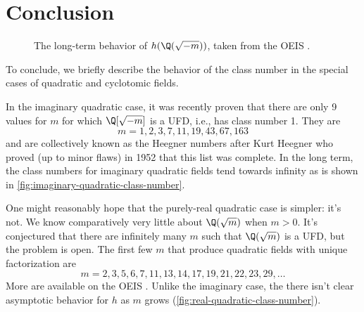 \section{Conclusion}

\begin{figure}[t]
    \centering
    \caption{The long-term behavior of $h(\Q(\sqrt{-m}))$, taken from the OEIS \cite[A000924]{oeis}.}
    \label{fig:imaginary-quadratic-class-number}
\end{figure}

To conclude, we briefly describe the behavior of the class number in the special cases of quadratic and cyclotomic fields.

In the imaginary quadratic case, it was recently proven that there are only 9 values for $m$ for which $\Q[\sqrt{-m}]$ is a UFD, i.e., has class number 1.
They are
\begin{equation}
    m = 1, 2, 3, 7, 11, 19, 43, 67, 163
\end{equation}
and are collectively known as the Heegner numbers \cite[A000924]{oeis} after Kurt Heegner who proved (up to minor flaws) in 1952 that this list was complete. In the long term, the class numbers for imaginary quadratic fields tend towards infinity as is shown in \autoref{fig:imaginary-quadratic-class-number}.

One might reasonably hope that the purely-real quadratic case is simpler: it's not. We know comparatively very little about $\Q(\sqrt m)$ when $m > 0$. It's conjectured that there are infinitely many $m$ such that $\Q(\sqrt m)$ is a UFD, but the problem is open.
The first few $m$ that produce quadratic fields with unique factorization are
\begin{equation}
    m = 2, 3, 5, 6, 7, 11, 13, 14, 17, 19, 21, 22, 23, 29, \ldots
\end{equation}
More are available on the OEIS \cite[A003172]{oeis}. Unlike the imaginary case, the there isn't clear asymptotic behavior for $h$ as $m$ grows (\autoref{fig:real-quadratic-class-number}).

